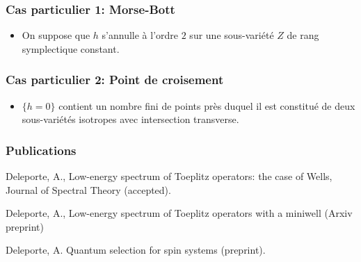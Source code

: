 \documentclass[mathserif]{beamer}
\begin{document}
\begin{frame}
  \frametitle{Cas particulier 1: Morse-Bott}
  \begin{itemize}
  \item On suppose que $h$ s'annulle à l'ordre $2$ sur une
    sous-variété $Z$ de rang symplectique constant.
  \end{itemize}
\end{frame}

\begin{frame}
  \frametitle{Cas particulier 2: Point de croisement}
  \begin{itemize}
  \item $\{h=0\}$ contient un nombre fini de points près duquel il est
    constitué de deux sous-variétés isotropes avec intersection transverse.
  \end{itemize}
\end{frame}

\begin{frame}
  \frametitle{Publications}
  Deleporte, A., Low-energy spectrum of Toeplitz operators: the case
  of Wells, Journal of Spectral Theory (accepted).
  \vspace{1em}
  
  Deleporte, A., Low-energy spectrum of Toeplitz operators with a
  miniwell (Arxiv preprint)
  \vspace{1em}
  
  Deleporte, A. Quantum selection for spin systems (preprint).
\end{frame}
\end{document}
